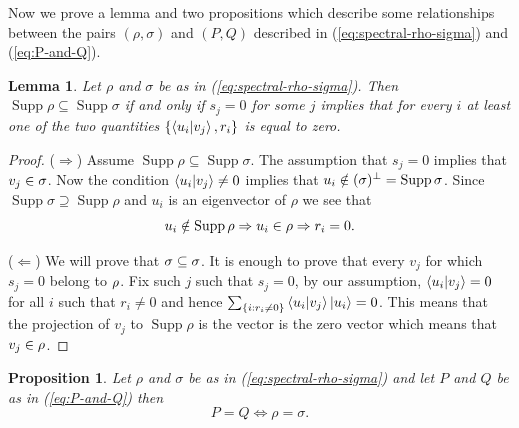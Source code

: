 \documentclass[12pt,a4paper,oneside]{article}
\numberwithin{equation}{section}
\theoremstyle{definition}  %
\theoremstyle{plain}  %
\newtheorem{lem}[defn]{Lemma}
\newtheorem{prop}[defn]{Proposition}
\theoremstyle{remark} %
\let\ker\relax
\DeclareMathOperator{\ker}{Ker}
\DeclareMathOperator{\supp}{Supp}
\begin{document}
Now we prove a lemma and two propositions which describe some relationships between the pairs $(\rho, \sigma)$ and $(P,Q)$  described in (\ref{eq:spectral-rho-sigma}) and (\ref{eq:P-and-Q}).
\begin{lem}\label{lem:support-condition}
Let $\rho$ and $\sigma$ be as in (\ref{eq:spectral-rho-sigma}). Then  $\supp \rho \subseteq \supp \sigma$ if and only if $s_j=0$ for some $j$ implies that for every $i$ at least one of the two quantities $\{\braket{u_i}{v_j}, r_i \}$ is equal to zero.  
\end{lem}
\begin{proof} ($\Rightarrow$) Assume $\supp \rho \subseteq \supp \sigma$.
The assumption that $s_j=0$ implies that $v_j\in \ker \sigma$. Now the condition $\braket{u_i}{v_j}\neq 0$ implies that $u_i\notin (\ker{\sigma})^{\perp} =\supp \sigma$. Since $\supp \sigma\supseteq\supp \rho$ and $u_i$ is an eigenvector of $\rho$ we see that \[u_i\notin\supp\rho \Rightarrow u_i\in \ker \rho \Rightarrow r_i=0.\]

($\Leftarrow$) We will prove that $\ker \sigma \subseteq \ker \sigma$. It is enough to prove that every $v_j$ for which $s_j = 0$ belong to $\ker \rho$. Fix such  $j$ such that $s_j=0$, by our assumption, $\braket{u_i}{v_j}=0$ for all $i$ such that $r_i\neq 0$ and hence $\sum_{\{i:r_i\neq 0\}}\braket{u_i}{v_j}\ket{u_i} = 0$. This means that the projection of $v_j$ to  $\supp \rho$ is the vector is the zero vector which means that $v_j\in \ker \rho$.
\end{proof}
\begin{prop}\label{prop:rho-equals-sigma-P-equals-Q}
Let $\rho$ and $\sigma$ be as in (\ref{eq:spectral-rho-sigma})  and let $P$ and $Q$ be as in (\ref{eq:P-and-Q}) then 
\[P=Q \Leftrightarrow \rho=\sigma.\]
\end{prop}
\end{document}

